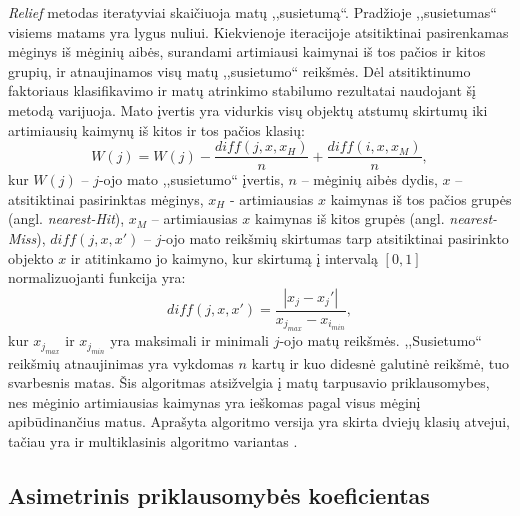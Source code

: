 \textit{Relief} metodas iteratyviai skaičiuoja matų ,,susietumą``. Pradžioje ,,susietumas`` visiems matams yra lygus nuliui. Kiekvienoje
iteracijoje atsitiktinai pasirenkamas mėginys iš mėginių aibės, surandami artimiausi kaimynai iš tos pačios ir kitos grupių, ir atnaujinamos visų 
matų ,,susietumo`` reikšmės. Dėl atsitiktinumo faktoriaus klasifikavimo ir  matų atrinkimo stabilumo rezultatai naudojant šį metodą varijuoja. Mato įvertis yra vidurkis visų objektų atstumų skirtumų iki artimiausių kaimynų iš kitos ir tos pačios klasių:
\begin{equation}
 W(j)=W(j) - \frac{diff(j, x, x_H)}{n} + \frac{diff(i, x, x_M)}{n},
\end{equation}
kur 
$W(j)$ -- $j$-ojo mato ,,susietumo`` įvertis, 
$n$ -- mėginių aibės dydis, 
$x$ -- atsitiktinai pasirinktas mėginys, 
$x_H$ - artimiausias $x$ kaimynas iš tos pačios grupės (angl. \textit{nearest-Hit}), 
$x_M$ -- artimiausias $x$ kaimynas iš kitos grupės (angl. \textit{nearest-Miss}),
$diff(j, x, x')$ -- $j$-ojo mato reikšmių skirtumas tarp atsitiktinai pasirinkto objekto $x$ ir atitinkamo jo kaimyno, kur skirtumą į intervalą $[0, 1]$ normalizuojanti funkcija yra:
\begin{equation}
 diff(j, x, x')=\frac{|x_j- x_j'|}{x_{j_{max}} - x_{i_{min}}},
\end{equation}
kur $x_{j_{max}}$ ir $x_{j_{min}}$ yra maksimali ir minimali $j$-ojo matų reikšmės. ,,Susietumo`` reikšmių atnaujinimas yra vykdomas $n$ kartų ir kuo didesnė galutinė reikšmė, tuo svarbesnis matas. Šis algoritmas atsižvelgia į matų tarpusavio priklausomybes, nes mėginio artimiausias kaimynas yra ieškomas pagal visus mėginį apibūdinančius matus. Aprašyta algoritmo versija yra skirta dviejų klasių atvejui, tačiau yra ir multiklasinis algoritmo variantas \cite{DBLP:journals/ml/Robnik-SikonjaK03}.

\subsection{Asimetrinis priklausomybės koeficientas}


